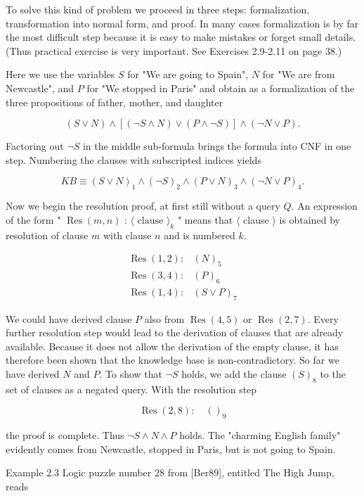 \documentclass[10pt]{book}
\begin{document}
To solve this kind of problem we proceed in three steps: formalization, transformation into normal form, and proof. In many cases formalization is by far the most difficult step because it is easy to make mistakes or forget small details. (Thus practical exercise is very important. See Exercises 2.9-2.11 on page 38.)

Here we use the variables $S$ for "We are going to Spain", $N$ for "We are from Newcastle", and $P$ for "We stopped in Paris" and obtain as a formalization of the three propositions of father, mother, and daughter

$$
(S \vee N) \wedge[(\neg S \wedge N) \vee(P \wedge \neg S)] \wedge(\neg N \vee P) .
$$

Factoring out $\neg S$ in the middle sub-formula brings the formula into CNF in one step. Numbering the clauses with subscripted indices yields

$$
K B \equiv(S \vee N)_{1} \wedge(\neg S)_{2} \wedge(P \vee N)_{3} \wedge(\neg N \vee P)_{4} .
$$

Now we begin the resolution proof, at first still without a query $Q$. An expression of the form " $\operatorname{Res}(m, n)$ : $\langle\text { clause }\rangle_{k}$ " means that $\langle$ clause $\rangle$ is obtained by resolution of clause $m$ with clause $n$ and is numbered $k$.

$$
\begin{array}{ll}
\operatorname{Res}(1,2): & (N)_{5} \\
\operatorname{Res}(3,4): & (P)_{6} \\
\operatorname{Res}(1,4): & (S \vee P)_{7}
\end{array}
$$

We could have derived clause $P$ also from $\operatorname{Res}(4,5)$ or $\operatorname{Res}(2,7)$. Every further resolution step would lead to the derivation of clauses that are already available. Because it does not allow the derivation of the empty clause, it has therefore been shown that the knowledge base is non-contradictory. So far we have derived $N$ and $P$. To show that $\neg S$ holds, we add the clause $(S)_{8}$ to the set of clauses as a negated query. With the resolution step

$$
\operatorname{Res}(2,8): \quad()_{9}
$$

the proof is complete. Thus $\neg S \wedge N \wedge P$ holds. The "charming English family" evidently comes from Newcastle, stopped in Paris, but is not going to Spain.

Example 2.3 Logic puzzle number 28 from [Ber89], entitled The High Jump, reads\\
\end{document}
